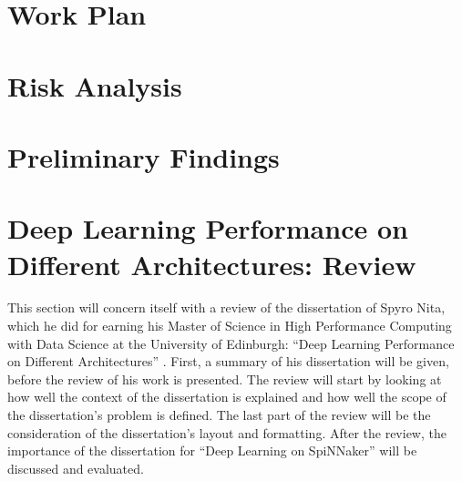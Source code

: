 \documentclass{article}
\begin{document}


\section{Work Plan} %
\label{sec:work_plan}


\section{Risk Analysis} %
\label{sec:risk_analysis}


\section{Preliminary Findings} %
\label{sec:prelim}






\section{Deep Learning Performance on Different %
  Architectures: Review}
\label{sec:review}

This section will concern itself with a review of the
dissertation of Spyro Nita, which he did for earning his
Master of Science in High Performance Computing with Data
Science at the University of Edinburgh:
``Deep Learning Performance on Different Architectures''
 \citep{nita_2018}.
First, a summary of his dissertation will be given, before
the review of his work is presented.
The review will start by looking at how well the context
of the dissertation is explained and how well the scope
of the dissertation's problem is defined.
The last part of the review will be the consideration of
the dissertation's layout and formatting.
After the review, the importance of the dissertation for
``Deep Learning on SpiNNaker'' will be discussed and
evaluated.
\end{document}
